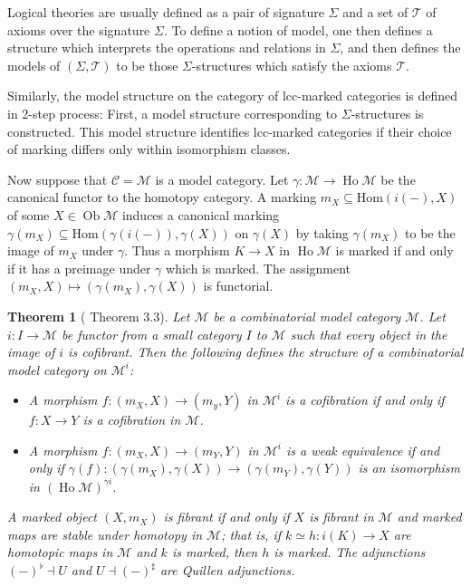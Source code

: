 \documentclass[a4paper]{article}
\newtheorem{theorem}{Theorem}
\theoremstyle{remark}
\theoremstyle{definition}
\begin{document}
Logical theories are usually defined as a pair of signature $\Sigma$ and a set of $\mathcal{T}$ of axioms over the signature $\Sigma$.
To define a notion of model, one then defines a structure which interprets the operations and relations in $\Sigma$, and then defines the models of $(\Sigma, \mathcal{T})$ to be those $\Sigma$-structures which satisfy the axioms $\mathcal{T}$.

Similarly, the model structure on the category of lcc-marked categories is defined in 2-step process:
First, a model structure corresponding to $\Sigma$-structures is constructed.
This model structure identifies lcc-marked categories if their choice of marking differs only within isomorphism classes.

Now suppose that $\mathcal{C} = \mathcal{M}$ is a model category.
Let $\gamma : \mathcal{M} \rightarrow \operatorname{Ho} \mathcal{M}$ be the canonical functor to the homotopy category.
A marking $m_X \subseteq \mathrm{Hom}(i(-), X)$ of some $X \in \operatorname{Ob} \mathcal{M}$ induces a canonical marking $\gamma(m_X) \subseteq \mathrm{Hom}(\gamma(i(-)), \gamma(X))$ on $\gamma(X)$ by taking $\gamma(m_X)$ to be the image of $m_X$ under $\gamma$.
Thus a morphism $K \rightarrow X$ in $\operatorname{Ho} \mathcal{M}$ is marked if and only if it has a preimage under $\gamma$ which is marked.
The assignment $(m_X, X) \mapsto (\gamma(m_X), \gamma(X))$ is functorial.

\begin{theorem}[\cite{marked-objects} Theorem 3.3]
  \label{th:marked-model-category}
  Let $\mathcal{M}$ be a combinatorial model category $\mathcal{M}$.
  Let $i : I \rightarrow \mathcal{M}$ be functor from a small category $I$ to $\mathcal{M}$ such that every object in the image of $i$ is cofibrant.
  Then the following defines the structure of a combinatorial model category on $\mathcal{M}^i$:
  \begin{itemize}
    \item
      A morphism $f : (m_X, X) \rightarrow (m_y, Y)$ in $\mathcal{M}^i$ is a cofibration if and only if $f : X \rightarrow Y$ is a cofibration in $\mathcal{M}$.
    \item
      A morphism $f : (m_X, X) \rightarrow (m_Y, Y)$ in $\mathcal{M}^i$ is a weak equivalence if and only if $\gamma(f) : (\gamma(m_X), \gamma(X)) \rightarrow (\gamma(m_Y), \gamma(Y))$ is an isomorphism in $(\operatorname{Ho} \mathcal{M})^{\gamma i}$.
  \end{itemize}
  A marked object $(X, m_X)$ is fibrant if and only if $X$ is fibrant in $\mathcal{M}$ and marked maps are stable under homotopy in $\mathcal{M}$; that is, if $k \simeq h : i(K) \rightarrow X$ are homotopic maps in $\mathcal{M}$ and $k$ is marked, then $h$ is marked.
  The adjunctions $(-)^\flat \dashv U$ and $U \dashv (-)^\sharp$ are Quillen adjunctions.
\end{theorem}
\end{document}
